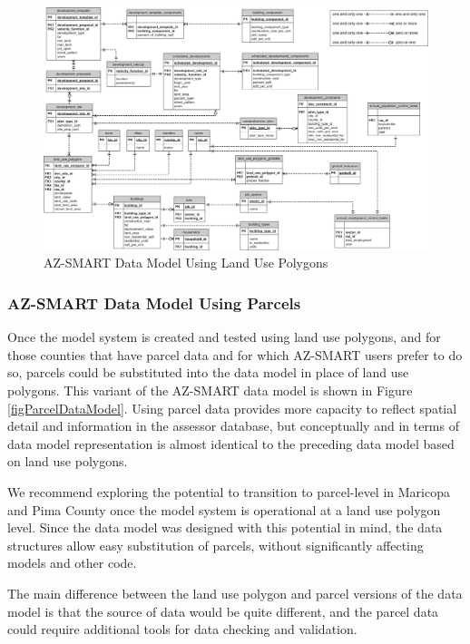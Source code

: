 \begin{figure}
\begin{center}
\includegraphics[scale=0.4]{../../datamodel/AZ-SMART_data_model_diagram_lupoly_based.png}
\caption{AZ-SMART Data Model Using Land Use Polygons}
\label{figLUPolyDataModel}
\end{center}
\end{figure}
\clearpage

\subsubsection{AZ-SMART Data Model Using Parcels}

Once the model system is created and tested using land use polygons, and for those counties that have
parcel data and for which AZ-SMART users prefer to do so, parcels could be substituted into the data model
in place of land use polygons.  This variant of the AZ-SMART data model is shown in Figure 
\ref{figParcelDataModel}.  Using parcel data provides more capacity to reflect spatial detail and information
in the assessor database, but conceptually and in terms of data model representation is almost identical to
the preceding data model based on land use polygons.

We recommend exploring the potential to transition to parcel-level in Maricopa and Pima County once the model
system is operational at a land use polygon level.  Since the data model was designed with this potential in mind,
the data structures allow easy substitution of parcels, without significantly affecting models and other code. 

The main difference between the land use polygon and parcel versions of the data model is that the source of
data would be quite different, and the parcel data could require additional tools for data checking and validation.

